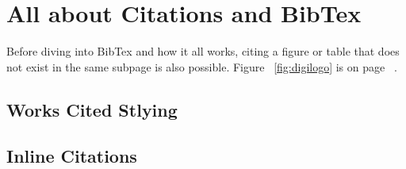 \documentclass[./dissertation.tex]{subfiles}
\begin{document}
    \chapter{All about Citations and BibTex}
    Before diving into BibTex and how it all works, citing a figure or table that does not exist in the same subpage is also possible. Figure ~\ref{fig:digilogo} is on page ~\pageref{fig:digilogo}. 
    \section{Works Cited Stlying}
    \section{Inline Citations}
\end{document}
